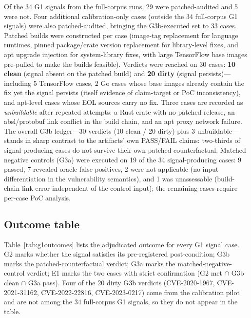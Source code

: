 \documentclass[11pt]{article}
\begin{document}
Of the 34 G1 signals from the full-corpus runs, 29 were patched-audited and 5 were not. Four additional calibration-only cases (outside the 34 full-corpus G1 signals) were also patched-audited, bringing the G3b-executed set to 33 cases. Patched builds were constructed per case (image-tag replacement for language runtimes, pinned package/crate version replacement for library-level fixes, and apt upgrade injection for system-library fixes, with large TensorFlow base images pre-pulled to make the builds feasible). Verdicts were reached on 30 cases: \textbf{10 clean} (signal absent on the patched build) and \textbf{20 dirty} (signal persists)---including 5 TensorFlow cases, 2 Go cases whose base images already contain the fix yet the signal persists (itself evidence of claim-target or PoC inconsistency), and apt-level cases whose EOL sources carry no fix. Three cases are recorded as \emph{unbuildable} after repeated attempts: a Rust crate with no patched release, an absl/protobuf link conflict in the build chain, and an apt proxy network failure. The overall G3b ledger---30 verdicts (10 clean / 20 dirty) plus 3 unbuildable---stands in sharp contrast to the artifacts' own PASS/FAIL claims: two-thirds of signal-producing cases do not survive their own patched counterfactual. Matched negative controls (G3a) were executed on 19 of the 34 signal-producing cases: 9 passed, 7 revealed oracle false positives, 2 were not applicable (no input differentiation in the vulnerability semantics), and 1 was unassessable (build-chain link error independent of the control input); the remaining cases require per-case PoC analysis.

\subsection{Outcome table}
Table~\ref{tab:g1outcomes} lists the adjudicated outcome for every G1 signal case. G2 marks whether the signal satisfies its pre-registered post-condition; G3b marks the patched-counterfactual verdict; G3a marks the matched-negative-control verdict; E1 marks the two cases with strict confirmation (G2 met $\cap$ G3b clean $\cap$ G3a pass). Four of the 20 dirty G3b verdicts (CVE-2020-1967, CVE-2021-31162, CVE-2022-22816, CVE-2023-0217) come from the calibration pilot and are not among the 34 full-corpus G1 signals, so they do not appear in the table.
\end{document}
